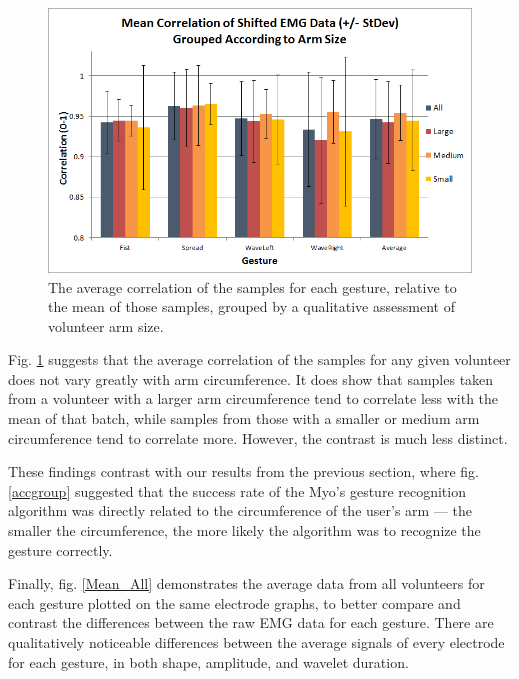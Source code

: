 \documentclass[journal]{IEEEtran}
\begin{document}
    \begin{figure}[H]
    \centering
    \includegraphics[width=.8\columnwidth]{EMG/Correlation_Grouped}
    \caption{The average correlation of the samples for each gesture, relative to the mean of those samples, grouped by a qualitative assessment of volunteer arm size.}
    \label{Correlation_Grouped}
    \end{figure}
    
Fig. \ref{Correlation_Grouped} suggests that the average correlation of the samples for any given volunteer does not vary greatly with arm circumference. It does show that samples taken from a volunteer with a larger arm circumference tend to correlate less with the mean of that batch, while samples from those with a smaller or medium arm circumference tend to correlate more. However, the contrast is much less distinct. 

These findings contrast with our results from the previous section, where fig. \ref{accgroup} suggested that the success rate of the Myo's gesture recognition algorithm was directly related to the circumference of the user's arm --- the smaller the circumference, the more likely the algorithm was to recognize the gesture correctly.

Finally, fig. \ref{Mean_All} demonstrates the average data from all volunteers for each gesture plotted on the same electrode graphs, to better compare and contrast the differences between the raw EMG data for each gesture.
There are qualitatively noticeable differences between the average signals of every electrode for each gesture, in both shape, amplitude, and wavelet duration. 
\end{document}
